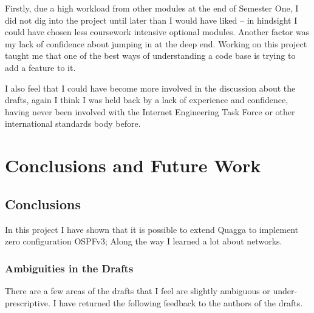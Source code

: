 Firstly, due a high workload from other modules at the end of Semester One, I
did not dig into the project until later than I would have liked -- in
hindsight I could have chosen less coursework intensive optional modules.
Another factor was my lack of confidence about jumping in at the deep end.
Working on this project taught me that one of the best ways of understanding
a code base is trying to add a feature to it.

I also feel that I could have become more involved in the discussion about the
drafts, again I think I was held back by a lack of experience and confidence,
having never been involved with the Internet Engineering Task Force or
other international standards body before. 

\chapter{Conclusions and Future Work}

\section{Conclusions}
In this project I have shown that it is possible to extend Quagga to implement
zero configuration OSPFv3; Along the way I learned a lot about networks. 

\subsection{Ambiguities in the Drafts}
There are a few areas of the drafts that I feel are slightly ambiguous or
under-prescriptive. I have returned the following feedback to the authors of
the drafts. 

